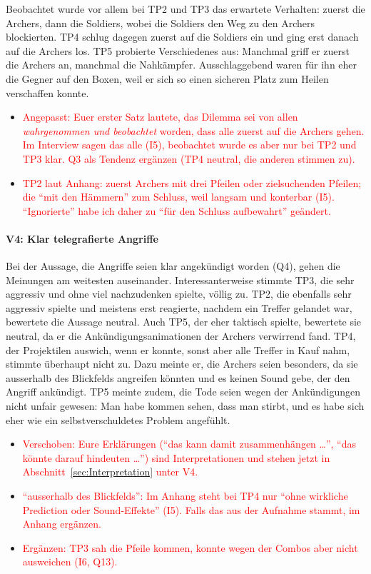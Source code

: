 \documentclass[../Main.tex]{subfiles}
\begin{document}
Beobachtet wurde vor allem bei TP2 und TP3 das erwartete Verhalten: zuerst die Archers, dann die Soldiers, wobei die Soldiers den Weg zu den Archers blockierten. TP4 schlug dagegen zuerst auf die Soldiers ein und ging erst danach auf die Archers los. TP5 probierte Verschiedenes aus: Manchmal griff er zuerst die Archers an, manchmal die Nahkämpfer. Ausschlaggebend waren für ihn eher die Gegner auf den Boxen, weil er sich so einen sicheren Platz zum Heilen verschaffen konnte.

\begin{itemize}[leftmargin=1.5cm]
    \item \textcolor{red}{Angepasst: Euer erster Satz lautete, das Dilemma sei von allen \emph{wahrgenommen und beobachtet} worden, dass alle zuerst auf die Archers gehen. Im Interview sagen das alle (I5), beobachtet wurde es aber nur bei TP2 und TP3 klar. Q3 als Tendenz ergänzen (TP4 neutral, die anderen stimmen zu).}
    \item \textcolor{red}{TP2 laut Anhang: zuerst Archers mit drei Pfeilen oder zielsuchenden Pfeilen; die \enquote{mit den Hämmern} zum Schluss, weil langsam und konterbar (I5). \enquote{Ignorierte} habe ich daher zu \enquote{für den Schluss aufbewahrt} geändert.}
\end{itemize}

\paragraph{V4: Klar telegrafierte Angriffe}
Bei der Aussage, die Angriffe seien klar angekündigt worden (Q4), gehen die Meinungen am weitesten auseinander. Interessanterweise stimmte TP3, die sehr aggressiv und ohne viel nachzudenken spielte, völlig zu. TP2, die ebenfalls sehr aggressiv spielte und meistens erst reagierte, nachdem ein Treffer gelandet war, bewertete die Aussage neutral. Auch TP5, der eher taktisch spielte, bewertete sie neutral, da er die Ankündigungsanimationen der Archers verwirrend fand. TP4, der Projektilen auswich, wenn er konnte, sonst aber alle Treffer in Kauf nahm, stimmte überhaupt nicht zu. Dazu meinte er, die Archers seien besonders, da sie ausserhalb des Blickfelds angreifen könnten und es keinen Sound gebe, der den Angriff ankündigt. TP5 meinte zudem, die Tode seien wegen der Ankündigungen nicht unfair gewesen: Man habe kommen sehen, dass man stirbt, und es habe sich eher wie ein selbstverschuldetes Problem angefühlt.

\begin{itemize}[leftmargin=1.5cm]
    \item \textcolor{red}{Verschoben: Eure Erklärungen (\enquote{das kann damit zusammenhängen \ldots}, \enquote{das könnte darauf hindeuten \ldots}) sind Interpretationen und stehen jetzt in Abschnitt~\ref{sec:Interpretation} unter V4.}
    \item \textcolor{red}{\enquote{ausserhalb des Blickfelds}: Im Anhang steht bei TP4 nur \enquote{ohne wirkliche Prediction oder Sound-Effekte} (I5). Falls das aus der Aufnahme stammt, im Anhang ergänzen.}
    \item \textcolor{red}{Ergänzen: TP3 sah die Pfeile kommen, konnte wegen der Combos aber nicht ausweichen (I6, Q13).}
\end{itemize}
\end{document}
